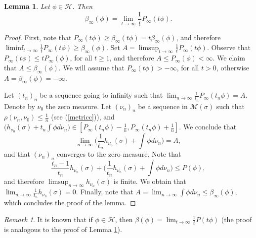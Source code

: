\documentclass[letterpaper,11pt]{amsart}
\theoremstyle{plain}
\theoremstyle{plain}
\newtheorem{lemma}[proposition]{Lemma}
\theoremstyle{definition}
\theoremstyle{remark}
\newtheorem{remark}{Remark}[section]
\def\M{{\mathcal M}}
\def\H{{\mathcal H}}
\begin{document}
\begin{lemma}\label{prop:betaas}
Let $\phi\in \H$. Then $$\beta_\infty(\phi)=\lim_{t\to\infty}\frac{1}{t}P_\infty(t\phi).$$
\end{lemma}
\begin{proof} First, note that $P_\infty(t\phi)\ge \beta_\infty(t\phi)=t\beta_\infty(\phi)$, and therefore $\liminf_{t\to\infty}\frac{1}{t}P_\infty(t\phi)\ge \beta_\infty(\phi)$. Set $A=\limsup_{t\to\infty}\frac{1}{t}P_\infty(t\phi)$. Observe that $P_\infty(t\phi)\le tP_\infty(\phi)$, for all $t\ge 1$, and therefore $A\le P_\infty(\phi)<\infty$. We claim that $A\le \beta_\infty(\phi)$. We will assume that $P_\infty(t\phi)>-\infty$, for all $t>0$, otherwise $A=\beta_\infty(\phi)=-\infty$. 

Let $(t_n)_n$ be a sequence going to infinity such that $\lim_{n\to\infty}\frac{1}{t_n}P_\infty(t_n\phi)=A$. Denote by $\nu_0$ the zero measure. Let $(\nu_n)_n$ be a sequence in $\M(\sigma)$ such that $\rho(\nu_n,\nu_0)\le \frac{1}{n}$ (see (\ref{metricc})), and $\big(h_{\nu_n}(\sigma)+t_n\int \phi d\nu_n\big)\in [P_\infty(t_n\phi)-\frac{1}{n},P_\infty(t_n\phi)+\frac{1}{n}]$. We conclude that 
$$\lim_{n\to\infty}\bigg(\frac{1}{t_n}h_{\nu_n}(\sigma)+\int \phi d\nu_n\bigg)=A,$$
and that $(\nu_n)_n$ converges to the zero measure. Note that 
$$\frac{t_n-1}{t_n}h_{\nu_n}(\sigma)+\bigg(\frac{1}{t_n}h_{\nu_n}(\sigma)+\int \phi d\nu_n\bigg)\le P(\phi),$$
and therefore $\limsup_{n\to\infty}h_{\nu_n}(\sigma)$ is finite. We obtain that $\lim_{n\to\infty}\frac{1}{t_n}h_{\nu_n}(\sigma)=0$. Finally, note that $A=\lim_{n\to\infty}\int \phi d\nu_n\le \beta_\infty(\phi)$, which concludes the proof of the lemma. \end{proof}

\begin{remark}\label{what} It is known that if $\phi\in \H$, then $\beta(\phi)=\lim_{t\to\infty}\frac{1}{t}P(t\phi)$ (the proof is analogous to the proof of Lemma \ref{prop:betaas}). %
\end{remark}
\end{document}
